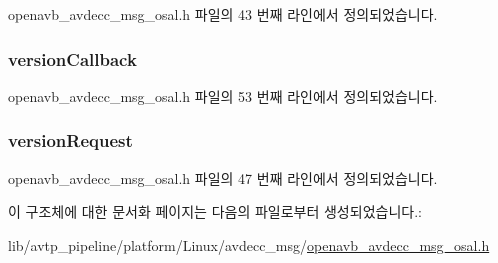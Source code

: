 openavb\+\_\+avdecc\+\_\+msg\+\_\+osal.\+h 파일의 43 번째 라인에서 정의되었습니다.

\subsubsection[{\texorpdfstring{version\+Callback}{versionCallback}}]{ version\+Callback}\hypertarget{structopenavb_avdecc_message__t_a0ad469bdc533caff5f91bf43c15ed6bf}{}\label{structopenavb_avdecc_message__t_a0ad469bdc533caff5f91bf43c15ed6bf}


openavb\+\_\+avdecc\+\_\+msg\+\_\+osal.\+h 파일의 53 번째 라인에서 정의되었습니다.

\subsubsection[{\texorpdfstring{version\+Request}{versionRequest}}]{ version\+Request}\hypertarget{structopenavb_avdecc_message__t_acb1dde86e7ec0d15978aa2a7c352458b}{}\label{structopenavb_avdecc_message__t_acb1dde86e7ec0d15978aa2a7c352458b}


openavb\+\_\+avdecc\+\_\+msg\+\_\+osal.\+h 파일의 47 번째 라인에서 정의되었습니다.



이 구조체에 대한 문서화 페이지는 다음의 파일로부터 생성되었습니다.\+:\begin{DoxyCompactItemize}
\item 
lib/avtp\+\_\+pipeline/platform/\+Linux/avdecc\+\_\+msg/\hyperlink{openavb__avdecc__msg__osal_8h}{openavb\+\_\+avdecc\+\_\+msg\+\_\+osal.\+h}\end{DoxyCompactItemize}
